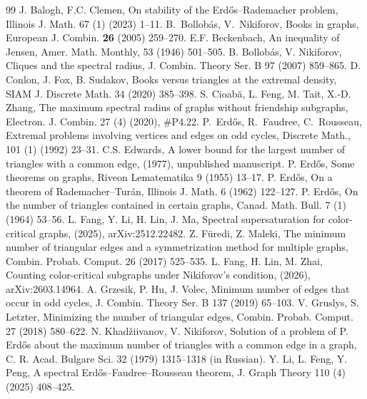 \documentclass[10pt,a4paper]{amsart}
\begin{document}
\begin{thebibliography}{99}
 J. Balogh, F.C. Clemen, On stability of the Erd\H{o}s--Rademacher problem, Illinois J. Math. 67 (1) (2023) 1--11.
 B.~Bollob\'as, V.~Nikiforov, Books in graphs, {European J. Combin.} \textbf{26} (2005) 259--270.
 E.F. Beckenbach, An inequality of Jensen, Amer. Math. Monthly, 53 (1946) 501--505.
 B. Bollob\'as, V. Nikiforov, Cliques and the spectral radius, {J. Combin. Theory Ser. B} 97 (2007) 859--865.
 D. Conlon, J. Fox, B. Sudakov, Books versus triangles at the extremal density, SIAM J. Discrete Math. 34 (2020) 385--398.
 S. Cioab\u{a}, L. Feng, M. Tait, X.-D. Zhang, The maximum spectral radius of graphs without friendship subgraphs, Electron. J. Combin. 27 (4) (2020), \#P4.22.
 P.~Erd\H{o}s, R.~Faudree, C.~Rousseau, Extremal problems involving vertices and edges on odd cycles, {Discrete Math.}, 101 (1) (1992) 23--31.
 C.S. Edwards, A lower bound for the largest number of triangles with a common edge, (1977), unpublished manuscript.
 P. Erd\H{o}s, Some theorems on graphs, Riveon Lematematika 9 (1955) 13--17.
 P. Erd\H{o}s, On a theorem of Rademacher--Tur\'{a}n, Illinois J. Math. 6 (1962) 122--127.
 P. Erd\H{o}s, On the number of triangles contained in certain graphs, Canad. Math. Bull. 7 (1) (1964) 53--56.
 L. Fang, Y. Li, H. Lin, J. Ma, Spectral supersaturation for color-critical graphs, (2025), arXiv:2512.22482.
 Z. F\"{u}redi, Z. Maleki, The minimum number of triangular edges and a symmetrization method for multiple graphs, Combin. Probab. Comput. 26 (2017) 525--535.
 L. Fang, H. Lin, M. Zhai, Counting color-critical subgraphs under Nikiforov's condition, (2026), arXiv:2603.14964.
 A. Grzesik, P. Hu, J. Volec, Minimum number of edges that occur in odd cycles, J. Combin. Theory Ser. B 137 (2019) 65--103.
 V. Gruslys, S. Letzter, Minimizing the number of triangular edges, Combin. Probab. Comput. 27 (2018) 580--622.
 N. Khad\v{z}iivanov, V. Nikiforov, Solution of a problem of P. Erd\H{o}s about the maximum number of triangles with a common edge in a graph, C. R. Acad. Bulgare Sci. 32 (1979) 1315--1318 (in Russian).
 Y. Li, L. Feng, Y. Peng, A spectral Erd\H{o}s--Faudree--Rousseau theorem, J. Graph Theory 110 (4) (2025) 408--425.

\end{thebibliography}
\end{document}

